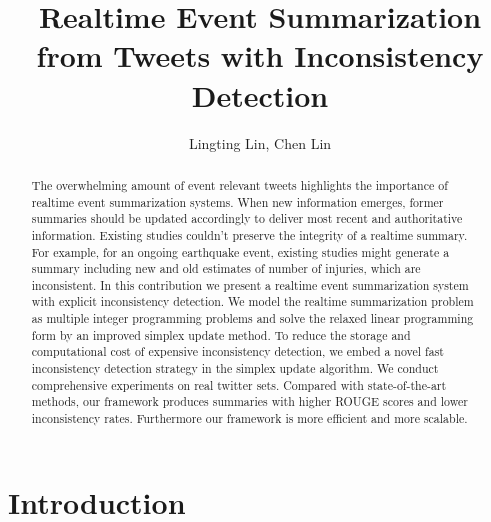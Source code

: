 \documentclass[envcountsame]{llncs}
\begin{document}
\title{Realtime Event Summarization from Tweets with Inconsistency Detection}
\author{Lingting Lin, Chen Lin}

\maketitle
\begin{abstract}
The overwhelming amount of event relevant tweets highlights the importance of realtime event summarization systems. When new information emerges,  former summaries should be updated accordingly to deliver most recent and authoritative information. Existing studies couldn't preserve the integrity of a realtime summary.  For example, for an ongoing earthquake event, existing studies might generate a  summary including new and old estimates of number of injuries, which are inconsistent. In this contribution we present a realtime event summarization system with explicit inconsistency detection. We model the realtime summarization problem as multiple integer programming problems and solve the relaxed linear programming form by an improved simplex update method. To reduce the storage and computational cost of expensive inconsistency detection, we embed a novel fast inconsistency detection strategy in the  simplex update algorithm. We conduct comprehensive experiments on real twitter sets.  Compared with state-of-the-art methods, our framework produces  summaries with higher ROUGE scores and lower  inconsistency rates. Furthermore our framework is more efficient and more scalable.
\end{abstract}

\section{Introduction}
\end{document}
